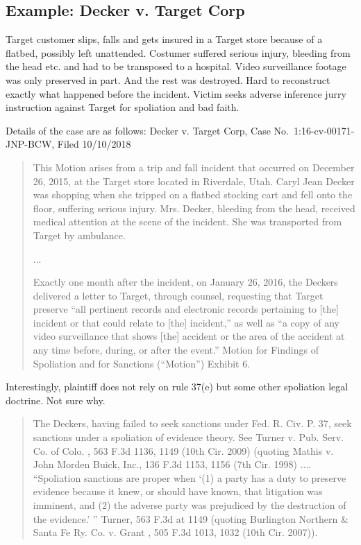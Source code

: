 \documentclass[
  10pt,
  dvipsnames,enabledeprecatedfontcommands]{scrartcl}
\begin{document}
\hypertarget{example-decker-v.-target-corp}{%
\subsection{Example: Decker v. Target
Corp}\label{example-decker-v.-target-corp}}

Target customer slips, falls and gets insured in a Target store because
of a flatbed, possibly left unattended. Costumer suffered serious
injury, bleeding from the head etc. and had to be transposed to a
hospital. Video surveillance footage was only preserved in part. And the
rest was destroyed. Hard to reconstruct exactly what happened before the
incident. Victim seeks adverse inference jurry instruction against
Target for spoliation and bad faith.

Details of the case are as follows: Decker v. Target Corp, Case
No.~1:16-cv-00171-JNP-BCW, Filed 10/10/2018

\begin{quote}
This Motion arises from a trip and fall incident that occurred on December 26, 2015, at the Target store
located in Riverdale, Utah. Caryl Jean Decker was shopping when she tripped on a flatbed stocking cart and
fell onto the floor, suffering serious injury. Mrs. Decker, bleeding from the head, received medical attention at the scene of the incident. She was transported from Target by ambulance.

...

Exactly one month after the incident, on January 26, 2016, the Deckers delivered a letter to Target, through
counsel, requesting that Target preserve “all pertinent records and electronic records pertaining to [the]
incident or that could relate to [the] incident,” as well as “a copy of any video surveillance that shows [the] accident or the area of the accident at any time before, during, or after the event.” Motion for Findings of Spoliation and for Sanctions (“Motion”) Exhibit 6.
\end{quote}

Interestingly, plaintiff does not rely on rule 37(e) but some other
spoliation legal doctrine. Not sure why.

\begin{quote}
The Deckers, having failed to seek sanctions under Fed. R. Civ. P. 37, seek sanctions under a spoliation of
evidence theory. See Turner v. Pub. Serv. Co. of Colo. , 563 F.3d 1136, 1149 (10th Cir. 2009) (quoting Mathis v. John Morden Buick, Inc., 136 F.3d 1153, 1156 (7th Cir. 1998) .... “Spoliation
sanctions are proper when ‘(1) a party has a duty to preserve evidence because it knew, or should have
known, that litigation was imminent, and (2) the adverse party was prejudiced by the destruction of the
evidence.’ ” Turner, 563 F.3d at 1149 (quoting Burlington Northern \& Santa Fe Ry. Co. v. Grant , 505 F.3d
1013, 1032 (10th Cir. 2007)).
\end{quote}
\end{document}
